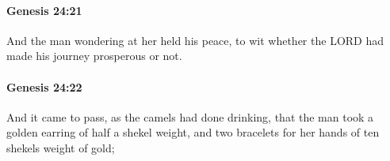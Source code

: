 		\paragraph{Genesis 24:21} %
			\label{GENESIS-24-21}

			And the man wondering at her held his peace, to wit whether the LORD had made his journey prosperous or not.


		\paragraph{Genesis 24:22} %
			\label{GENESIS-24-22}

			And it came to pass, as the camels had done drinking, that the man took a golden earring of half a shekel weight, and two bracelets for her hands of ten shekels weight of gold;


